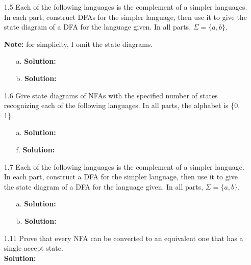 \begin{enumerate}
\item[1.5]Each of the following languages is the complement of a simpler languages. In each part, construct DFAs for the simpler language, then use it to give the state diagram of a DFA for the language given. In all parts, $\Sigma = \{a, b\}$.

\par \textbf{Note:} for simplicity, I omit the state diagrams. 
\begin{enumerate}
\item[a.]\textbf{Solution:} \alreadyanswered
\item[b.]\textbf{Solution:} \alreadyanswered
\end{enumerate}

\item[1.6]Give state diagrams of NFAs with the specified number of states recognizing each of the following languages. In all parts, the alphabet is \{0, 1\}.
\begin{enumerate}
\item[a.]\textbf{Solution:} \alreadyanswered
\item[f.]\textbf{Solution:} \alreadyanswered
\end{enumerate}

\item[1.7]Each of the following languages is the complement of a simpler language. In each part, construct a DFA for the simpler language, then use it to give the state diagram of a DFA for the language given. In all parts, $\Sigma = \{a, b\}$.
\begin{enumerate}
\item[a.]\textbf{Solution:} \alreadyanswered
\item[b.]\textbf{Solution:} \alreadyanswered
\end{enumerate}

\item[1.11]Prove that every NFA can be converted to an equivalent one that has a single accept state.
\\
\textbf{Solution:} \alreadyanswered


\end{enumerate}
